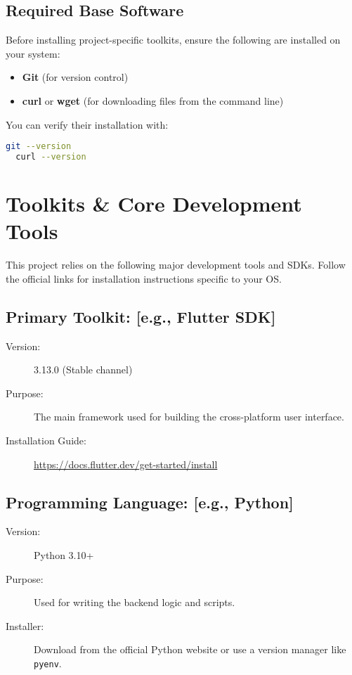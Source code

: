 \documentclass[11pt]{article}
\begin{document}
\subsection{Required Base Software}
Before installing project-specific toolkits, ensure the following are installed on your system:
\begin{itemize}
    \item \textbf{Git} (for version control)
    \item \textbf{curl} or \textbf{wget} (for downloading files from the command line)
\end{itemize}

You can verify their installation with:
\begin{lstlisting}[language=bash]
  git --version
  curl --version
\end{lstlisting}

\section{Toolkits \& Core Development Tools}
This project relies on the following major development tools and SDKs. Follow the official links for installation instructions specific to your OS.

\subsection{Primary Toolkit: [e.g., Flutter SDK]}
\begin{description}
    \item[Version:] 3.13.0 (Stable channel)
    \item[Purpose:] The main framework used for building the cross-platform user interface.
    \item[Installation Guide:] \url{https://docs.flutter.dev/get-started/install}
\end{description}

\subsection{Programming Language: [e.g., Python]}
\begin{description}
    \item[Version:] Python 3.10+
    \item[Purpose:] Used for writing the backend logic and scripts.
    \item[Installer:] Download from the official Python website or use a version manager like \texttt{pyenv}.
\end{description}
\end{document}
